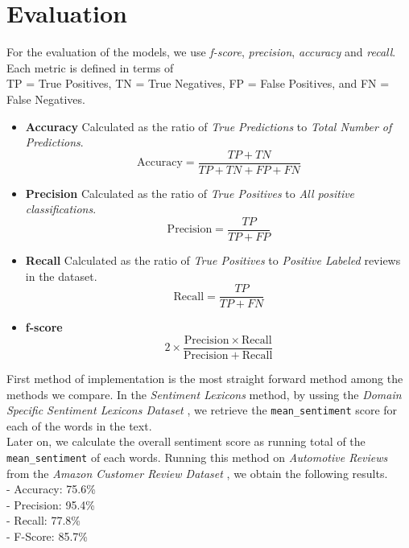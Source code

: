 \documentclass[11pt,a4paper]{article}
\begin{document}
\section{Evaluation}
For the evaluation of the models, we use \textit{f-score}, \textit{precision}, \textit{accuracy} and \textit{recall}. Each metric is defined in terms of \\TP = True Positives, TN = True Negatives, FP = False Positives, and FN = False Negatives.

\begin{itemize}
	\item \textbf{Accuracy}
		Calculated as the ratio of \textit{True Predictions} to  \textit{Total Number of Predictions}. 
		\begin{equation}
			\mathrm{Accuracy} = \frac{TP + TN}{TP + TN + FP + FN}
		\end{equation}

	
	\item \textbf{Precision}
		 Calculated as the ratio of \textit{True Positives} to  \textit{All positive classifications}.
		\begin{equation}
			\mathrm{Precision} =\frac{TP}{TP + FP}
		\end{equation}

	\item \textbf{Recall}
		 Calculated as the ratio of \textit{True Positives} to  \textit{Positive Labeled} reviews in the dataset. 
		\begin{equation}
			\mathrm{Recall} = \frac{TP}{TP + FN}
		\end{equation}
	\item \textbf{f-score}
	\begin{equation}
		2 \times \frac{\mathrm{Precision}\times\mathrm{Recall}}{\mathrm{Precision} + \mathrm{Recall}}
	\end{equation}
\end{itemize}

First method of implementation is the most straight forward method among the methods we compare. In the \textit{Sentiment Lexicons} method, by ussing the \textit{Domain Specific Sentiment Lexicons Dataset} \cite{hamilton2016inducing}, we retrieve the \texttt{mean\_sentiment} score for each of the words in the text. \\

Later on, we calculate the overall sentiment score as running total of the \texttt{mean\_sentiment} of each words. 
Running this method on \textit{Automotive Reviews} from the \textit{Amazon Customer Review Dataset} \cite{He_2016, mcauley2015imagebased}, we obtain the following results.\\
	- Accuracy: 75.6\% \\
	- Precision: 95.4\% \\
	- Recall: 77.8\% \\
	- F-Score: 85.7\% \\
\end{document}
